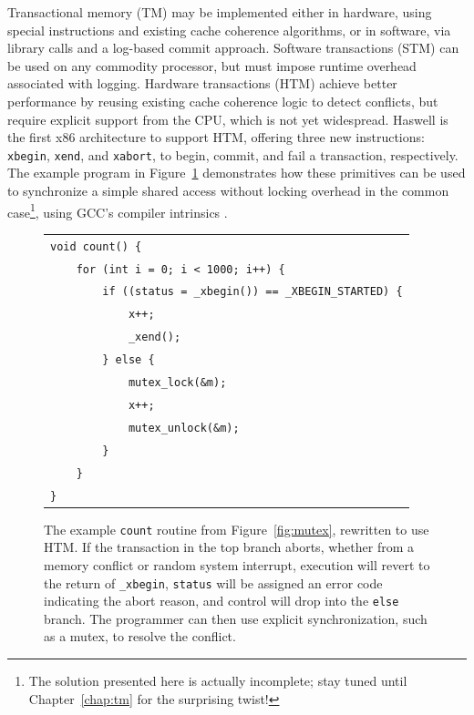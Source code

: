 Transactional memory (TM) may be implemented either in hardware, using special instructions and existing cache coherence algorithms,
or in software, via library calls and a log-based commit approach.
Software transactions (STM) \cite{stm-pldi06} can be used on any commodity processor, but must impose runtime overhead associated with logging.
Hardware transactions (HTM) \cite{htm-experience, htm-performance} achieve better performance by reusing existing cache coherence logic to detect conflicts, but require explicit support from the CPU, which is not yet widespread.
Haswell \cite{htm-haswell} is the first x86 architecture to support HTM,
offering three new instructions: \texttt{xbegin}, \texttt{xend}, and \texttt{xabort}, to begin, commit, and fail a transaction, respectively.
The example program in Figure~\ref{fig:htm-example} demonstrates how these primitives can be used to synchronize a simple shared access without locking overhead in the common case\footnote{
	The solution presented here is actually incomplete; stay tuned until Chapter~\ref{chap:tm} for the surprising twist!
},
using GCC's compiler intrinsics \cite{htm-gcc}.

\begin{figure}[h]
	\begin{center}
		\begin{tabular}{l}
		\texttt{void count() \{} \\
		\texttt{~~~~for (int i = 0; i < 1000; i++) \{} \\
		\texttt{~~~~~~~~if ((status = \_xbegin()) == \_XBEGIN\_STARTED) \{} \\
		\texttt{~~~~~~~~~~~~x++;} \\
		\texttt{~~~~~~~~~~~~\_xend();} \\
		\texttt{~~~~~~~~\} else \{} \\
		\texttt{~~~~~~~~~~~~mutex\_lock(\&m);} \\
		\texttt{~~~~~~~~~~~~x++;} \\
		\texttt{~~~~~~~~~~~~mutex\_unlock(\&m);} \\
		\texttt{~~~~~~~~\}} \\
		\texttt{~~~~\}} \\
		\texttt{\}} \\
		\end{tabular}
	\end{center}
	\caption{The example {\tt count} routine from Figure~\ref{fig:mutex}, rewritten to use HTM.
		If the transaction in the top branch aborts,
		whether from a memory conflict or random system interrupt,
		execution will revert to the return of {\tt \_xbegin},
		{\tt status} will be assigned an error code indicating the abort reason,
		and control will drop into the {\tt else} branch.
		The programmer can then use explicit synchronization, such as a mutex, to resolve the conflict.}
	\label{fig:htm-example}
\end{figure}

